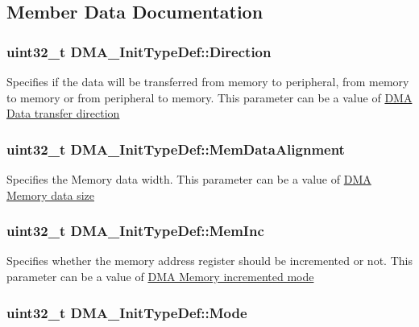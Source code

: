 \subsection{Member Data Documentation}
\hypertarget{struct_d_m_a___init_type_def_a0145b5d0e074fa8e2e185ecf2c4a15ca}{
\subsubsection[{Direction}]{\setlength{\rightskip}{0pt plus 5cm}uint32\-\_\-t D\-M\-A\-\_\-\-Init\-Type\-Def\-::\-Direction}}\label{struct_d_m_a___init_type_def_a0145b5d0e074fa8e2e185ecf2c4a15ca}
Specifies if the data will be transferred from memory to peripheral, from memory to memory or from peripheral to memory. This parameter can be a value of \hyperlink{group___d_m_a___data__transfer__direction}{D\-M\-A Data transfer direction} \hypertarget{struct_d_m_a___init_type_def_a7784efedc4a61325fa7364fcace10136}{
\subsubsection[{Mem\-Data\-Alignment}]{\setlength{\rightskip}{0pt plus 5cm}uint32\-\_\-t D\-M\-A\-\_\-\-Init\-Type\-Def\-::\-Mem\-Data\-Alignment}}\label{struct_d_m_a___init_type_def_a7784efedc4a61325fa7364fcace10136}
Specifies the Memory data width. This parameter can be a value of \hyperlink{group___d_m_a___memory__data__size}{D\-M\-A Memory data size} \hypertarget{struct_d_m_a___init_type_def_a49b187ba5ab8ba4354e02837e8b99414}{
\subsubsection[{Mem\-Inc}]{\setlength{\rightskip}{0pt plus 5cm}uint32\-\_\-t D\-M\-A\-\_\-\-Init\-Type\-Def\-::\-Mem\-Inc}}\label{struct_d_m_a___init_type_def_a49b187ba5ab8ba4354e02837e8b99414}
Specifies whether the memory address register should be incremented or not. This parameter can be a value of \hyperlink{group___d_m_a___memory__incremented__mode}{D\-M\-A Memory incremented mode} \hypertarget{struct_d_m_a___init_type_def_adbbca090b53d32ac93cc7359b7994db2}{
\subsubsection[{Mode}]{\setlength{\rightskip}{0pt plus 5cm}uint32\-\_\-t D\-M\-A\-\_\-\-Init\-Type\-Def\-::\-Mode}}\label{struct_d_m_a___init_type_def_adbbca090b53d32ac93cc7359b7994db2}
